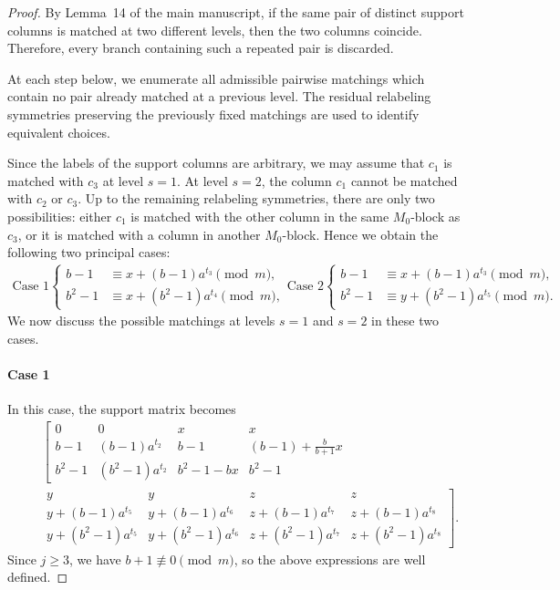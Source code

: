 \documentclass[11pt]{article}
\newcommand{\mymod}{\pmod{m}}
\begin{document}
\begin{proof}
By Lemma~14 of the main manuscript, if the same pair of distinct support columns is matched at two different levels, then the two columns coincide. Therefore, every branch containing such a repeated pair is discarded.

At each step below, we enumerate all admissible pairwise matchings which contain no pair already matched at a previous level. The residual relabeling symmetries preserving the previously fixed matchings are used to identify equivalent choices.

Since the labels of the support columns are arbitrary, we may assume
that $c_1$ is matched with $c_3$ at level $s=1$. At level $s=2$, the
column $c_1$ cannot be matched with $c_2$ or $c_3$. Up to the
remaining relabeling symmetries, there are only two possibilities:
either $c_1$ is matched with the other column in the same $M_0$-block
as $c_3$, or it is matched with a column in another $M_0$-block.
Hence we obtain the following two principal cases:
\begin{align*}
    \text{Case 1}
    \begin{cases}
    	b-1 &\equiv x+(b-1)a^{t_3}\mymod, \\
    	b^2-1 &\equiv x+(b^2-1)a^{t_4}\mymod,
    \end{cases}
    \text{Case 2}
    \begin{cases}
    	b-1 &\equiv x+(b-1)a^{t_3}\mymod, \\
    	b^2-1 &\equiv y+(b^2-1)a^{t_5}\mymod.
    \end{cases}
    \end{align*}
We now discuss the possible matchings at levels $s=1$ and $s=2$ in these two cases.
\paragraph{Case 1}
In this case, the support matrix becomes
\begin{eqnarray*}
		~&~&\left[\begin{array}{cccc}
			0 & 0 
			& x & x \\
			b-1 & (b-1)a^{t_2} 
			& b-1 & (b-1)+\frac{b}{b+1}x\\
            b^2 -1 & (b^2-1)a^{t_2} 
			& b^2-1-bx &b^2-1
            \end{array}
            \right.\\
			~&~& \left. \begin{array}{cccc}
             y & y 
			& z & z\\
			  y+(b-1)a^{t_5} & y+(b-1)a^{t_6}
			& z+(b-1)a^{t_7} & z+(b-1)a^{t_8} \\
			  y+(b^2-1)a^{t_5} & y+(b^2-1)a^{t_6}
			& z+(b^2-1)a^{t_7} & z+(b^2-1)a^{t_8}
        \end{array}
        \right].
\end{eqnarray*}
Since $j\geq 3$, we have $b+1\not\equiv0\mymod$, so the
above expressions are well defined.


\end{proof}
\end{document}
